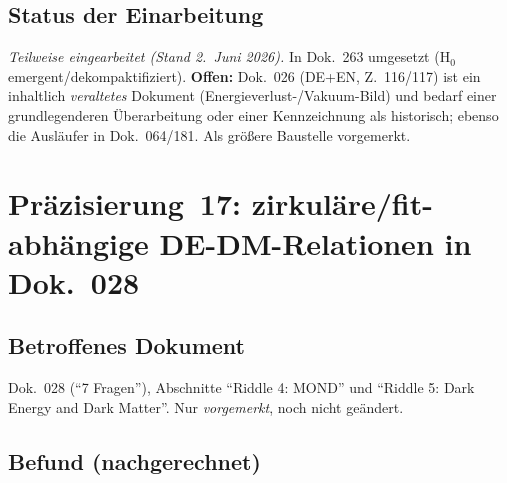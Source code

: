 \subsection*{Status der Einarbeitung}

\emph{Teilweise eingearbeitet (Stand 2.~Juni 2026).} In Dok.~263 umgesetzt
(H$_0$ emergent/dekompaktifiziert). \textbf{Offen:} Dok.~026 (DE+EN, Z.~116/117)
ist ein inhaltlich \emph{veraltetes} Dokument (Energieverlust-/Vakuum-Bild) und
bedarf einer grundlegenderen Überarbeitung oder einer Kennzeichnung als
historisch; ebenso die Ausläufer in Dok.~064/181. Als größere Baustelle
vorgemerkt.

\section{\texorpdfstring{Präzisierung~17: zirkuläre/fit-abhängige DE-DM-Relationen in Dok.~028}{Praezisierung 17: zirkulaere DE-DM-Relationen in Dok 028}}

\subsection*{Betroffenes Dokument}

Dok.~028 (\enquote{7 Fragen}), Abschnitte \enquote{Riddle 4: MOND} und
\enquote{Riddle 5: Dark Energy and Dark Matter}. Nur \emph{vorgemerkt}, noch
nicht geändert.

\subsection*{Befund (nachgerechnet)}

